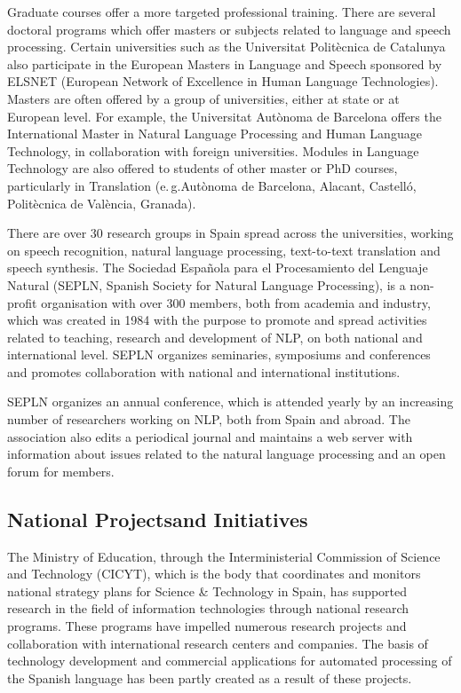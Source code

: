 \begin{multicols}{2}
Graduate courses offer a more targeted professional training. There are several doctoral programs which offer masters or subjects related to language and speech processing. Certain universities such as the Universitat Politècnica de Catalunya also participate in the European Masters in Language and Speech sponsored by ELSNET (European Network of Excellence in Human Language Technologies). Masters are often offered by a group of universities, either at state or at European level. For example, the Universitat Autònoma de Barcelona offers the International Master in Natural Language Processing and Human Language Technology, in collaboration with foreign universities. Modules in Language Technology are also offered to students of other master or PhD courses, particularly in Translation (e.\,g.Autònoma de Barcelona, Alacant, Castelló, Politècnica de València, Granada).

There are over 30 research groups in Spain spread across the universities, working on speech recognition, natural language processing, text-to-text translation and speech synthesis. The Sociedad Española para el Procesamiento del Lenguaje Natural (SEPLN, Spanish Society for Natural Language Processing), is a non-profit organisation with over 300 members, both from academia and industry, which was created in 1984 with the purpose to promote and spread activities related to teaching, research and development of NLP, on both national and international level. SEPLN organizes seminaries, symposiums and conferences and promotes collaboration with national and international institutions.

SEPLN organizes an annual conference, which is attended yearly by an increasing number of researchers working on NLP, both from Spain and abroad. The association also edits a periodical journal and maintains a web server with information about issues related to the natural language processing and an open forum for members. 

\subsection[National Projects and Initiatives]{National Projects\newline and Initiatives}

The Ministry of Education, through the Interministerial Commission of Science and Technology (CICYT), which is the body that coordinates and monitors national strategy plans for Science \& Technology in Spain, has supported research in the field of information technologies through national research programs. These programs have impelled numerous research projects and collaboration with international research centers and companies. The basis of technology development and commercial applications for automated processing of the Spanish language has been partly created as a result of these projects.


\end{multicols}
